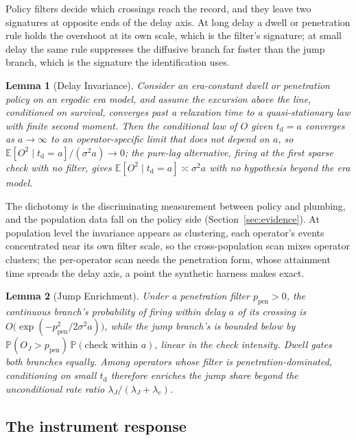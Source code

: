\documentclass[11pt,a4paper]{article}
\theoremstyle{definition}
\theoremstyle{plain}
\newtheorem{lemma}{Lemma}
\theoremstyle{remark}
\newcommand{\tact}{t_{\mathrm{d}}}
\begin{document}
Policy filters decide which crossings reach the record, and they leave two signatures at opposite ends of the delay axis. At long delay a dwell or penetration rule holds the overshoot at its own
scale, which is the filter's signature; at small delay the same rule suppresses the diffusive branch far faster than the jump branch, which is the signature the identification uses.

\begin{lemma}[Delay Invariance]\label{lem:invariance}
Consider an era-constant dwell or penetration policy on an ergodic era model, and assume the excursion above the line, conditioned on survival, converges past a relaxation time to a quasi-stationary
law with finite second moment. Then the conditional law of $O$ given $\tact = a$ converges as $a \to \infty$ to an operator-specific limit that does not depend on $a$, so
$\mathbb{E}[O^2 \mid \tact = a]/(\sigma^2 a) \to 0$; the pure-lag alternative, firing at the first sparse check with no filter, gives $\mathbb{E}[O^2 \mid \tact = a] \asymp \sigma^2 a$ with no
hypothesis beyond the era model.
\end{lemma}

The dichotomy is the discriminating measurement between policy and plumbing, and the population data fall on the policy side (Section~\ref{sec:evidence}). At population level the invariance
appears as clustering, each operator's events concentrated near its own filter scale, so the cross-population scan mixes operator clusters; the per-operator scan needs the penetration form, whose
attainment time spreads the delay axis, a point the synthetic harness makes exact.

\begin{lemma}[Jump Enrichment]\label{lem:enrichment}
Under a penetration filter $p_{\mathrm{pen}} > 0$, the continuous branch's probability of firing within delay $a$ of its crossing is $O\big(\exp(-p_{\mathrm{pen}}^2/2\sigma^2 a)\big)$, while the jump
branch's is bounded below by $\mathbb{P}(O_J > p_{\mathrm{pen}})\,\mathbb{P}(\text{check within } a)$, linear in the check intensity. Dwell gates both branches equally. Among operators whose 
filter is penetration-dominated, conditioning on small $\tact$ therefore enriches the jump share beyond the unconditional rate ratio $\lambda_J/(\lambda_J +
\lambda_c)$.
\end{lemma}

\subsection{The instrument response}\label{sec:response}
\end{document}
